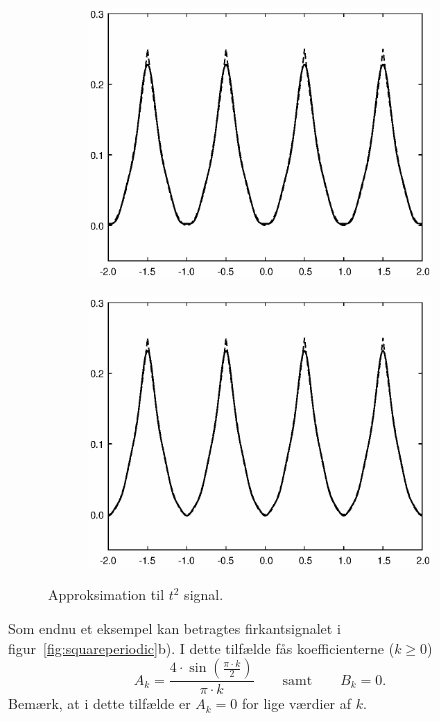 \documentclass[11pt,a4paper]{article}
\begin{document}
\begin{figure}[htbp]
\begin{subfigure}{0.48\textwidth}
\includegraphics[scale=0.5]{approx1_004}
\end{subfigure}
\begin{subfigure}{0.48\textwidth}
\includegraphics[scale=0.5]{approx1_005}
\end{subfigure}
\caption{\label{fig:figapprox1}Approksimation til $t^2$ signal.}
\end{figure}

Som endnu et eksempel kan betragtes firkantsignalet i figur~\ref{fig:squareperiodic}b). I dette tilfælde fås koefficienterne ($k\ge{}0$)
\begin{equation}
A_{k} = \frac{4\cdot\sin\left(\frac{\pi\cdot{}k}{2}\right)}{\pi\cdot{}k}
\qquad{}\textrm{samt}
\qquad{}B_{k} = 0.
\end{equation}
Bemærk, at i dette tilfælde er $A_k=0$ for lige værdier af $k$.
\end{document}
